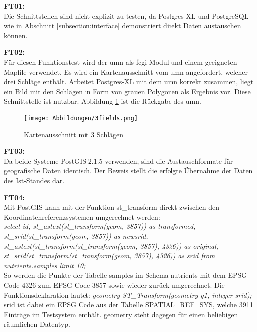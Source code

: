
\textbf{FT01:}\\
Die Schnittstellen sind nicht explizit zu testen, da Postgres-XL und PostgreSQL wie in Abschnitt \ref{subsection:interface} demonstriert direkt Daten austauschen können.

\textbf{FT02:}\\
Für diesen Funktionstest wird der \Gls{umn} als \Gls{fcgi} Modul und einem geeigneten Mapfile verwendet.
Es wird ein Kartenausschnitt vom \Gls{umn} angefordert, welcher drei Schläge enthält.
Arbeitet Postgres-XL mit dem \Gls{umn} korrekt zusammen, liegt ein Bild mit den Schlägen in Form von  grauen Polygonen als Ergebnis vor.
Diese Schnittstelle ist nutzbar.
Abbildung \ref{fig:3fields} ist die Rückgabe des \Gls{umn}.
\begin{figure}[h!]
\centering
\texttt{[image: Abbildungen/3fields.png]}
\caption[Kartenausschnitt mit 3 Schlägen]{Kartenausschnitt mit 3 Schlägen}
\label{fig:3fields}
\end{figure}
\newpage
\textbf{FT03:}\\
Da beide Systeme PostGIS 2.1.5 verwenden, sind die Austauschformate für geografische Daten identisch.
Der Beweis stellt die erfolgte Übernahme der Daten des Ist-Standes dar.

\textbf{FT04:}\\
Mit PostGIS kann mit der Funktion st\_{}transform direkt zwischen den Koordinatenreferenzsystemen umgerechnet werden:\\
\textit{select id, st\_{}astext(st\_{}transform(geom, 3857)) as transformed, st\_{}srid(st\_{}transform(geom, 3857)) as newsrid, st\_{}astext(st\_{}transform(st\_{}transform(geom, 3857), 4326)) as original, st\_{}srid(st\_{}transform(st\_{}transform(geom, 3857), 4326)) as srid from nutrients.samples limit 10;}\\
So werden die Punkte der Tabelle samples im Schema nutrients mit dem EPSG Code 4326 zum EPSG Code 3857 sowie wieder zurück umgerechnet.
Die Funktionsdeklaration lautet:
\textit{geometry ST\_{}Transform(geometry g1, integer srid);}\\
srid ist dabei ein EPSG Code aus der Tabelle SPATIAL\_{}REF\_{}SYS, welche 3911 Einträge im Testsystem enthält.
geometry steht dagegen für einen beliebigen räumlichen Datentyp.

